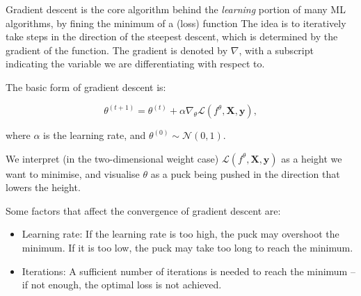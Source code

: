Gradient descent is the core algorithm behind the \textit{learning} portion of many ML algorithms, by fining the minimum of a (loss) function The idea is to iteratively take steps in the direction of the steepest descent, which is determined by the gradient of the function. The gradient is denoted by \(\nabla\), with a subscript indicating the variable we are differentiating with respect to.

The basic form of gradient descent is:

\[
    \theta^{(t+1)} = \theta^{(t)} + \alpha \nabla_\theta \mathcal{L}(f^\theta, \bm{X}, \bm{y}),
\]

where \(\alpha\) is the learning rate, and \(\theta^{(0)} \sim \mathcal{N}(0, 1)\).\bigskip


We interpret (in the two-dimensional weight case) \(\mathcal{L}(f^\theta, \bm{X}, \bm{y})\) as a height we want to minimise, and visualise \(\theta\) as a puck being pushed in the direction that lowers the height.\bigskip

Some factors that affect the convergence of gradient descent are:
\begin{itemize}
    \item Learning rate: If the learning rate is too high, the puck may overshoot the minimum. If it is too low, the puck may take too long to reach the minimum.
    \item Iterations: A sufficient number of iterations is needed to reach the minimum – if not enough, the optimal loss is not achieved.
\end{itemize}


